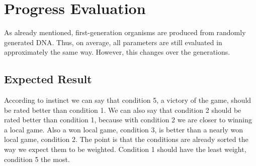 \section{Progress Evaluation}
As already mentioned, first-generation organisms are produced from randomly generated DNA. Thus, on average, all parameters are still evaluated in approximately the same way. However, this changes over the generations.

\subsection{Expected Result}
According to instinct we can say that condition 5, a victory of the game, should be rated better than condition 1. We can also say that condition 2 should be rated better than condition 1, because with condition 2 we are closer to winning a local game. Also a won local game, condition 3, is better than a nearly won local game, condition 2.
The point is that the conditions are already sorted the way we expect them to be weighted. Condition 1 should have the least weight, condition 5 the most.

